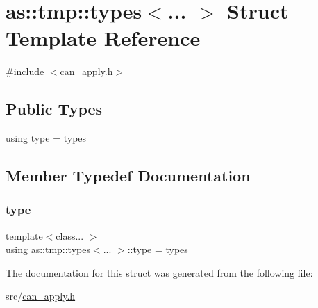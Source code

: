 \hypertarget{structas_1_1tmp_1_1types}{}\section{as\+:\+:tmp\+:\+:types$<$... $>$ Struct Template Reference}
\label{structas_1_1tmp_1_1types}


{\ttfamily \#include $<$can\+\_\+apply.\+h$>$}

\subsection*{Public Types}
\begin{DoxyCompactItemize}
\item 
using \hyperlink{structas_1_1tmp_1_1types_a8fee0852270845709fbb995347ac8fa3}{type} = \hyperlink{structas_1_1tmp_1_1types}{types}
\end{DoxyCompactItemize}


\subsection{Member Typedef Documentation}
\mbox{\label{structas_1_1tmp_1_1types_a8fee0852270845709fbb995347ac8fa3}} 
\subsubsection{\texorpdfstring{type}{type}}
{\footnotesize\ttfamily template$<$class... $>$ \\
using \hyperlink{structas_1_1tmp_1_1types}{as\+::tmp\+::types}$<$... $>$\+::\hyperlink{structas_1_1tmp_1_1types_a8fee0852270845709fbb995347ac8fa3}{type} =  \hyperlink{structas_1_1tmp_1_1types}{types}}



The documentation for this struct was generated from the following file\+:\begin{DoxyCompactItemize}
\item 
src/\hyperlink{can__apply_8h}{can\+\_\+apply.\+h}\end{DoxyCompactItemize}
